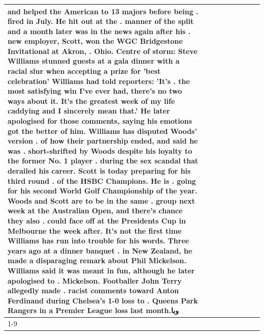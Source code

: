 \begin{table}[H]
\begin{tabular}{lllrlllll}
and helped the American to 13 majors before being . fired in July. He hit out at the . manner of the split and a month later was in the news again after his . new employer, Scott, won the WGC Bridgestone Invitational at Akron, . Ohio. Centre of storm: Steve Williams stunned guests at a gala dinner with a racial slur when accepting a prize for 'best celebration' Williams had told reporters: 'It's . the most satisfying win I've ever had, there's no two ways about it. It's the greatest week of my life caddying and I sincerely mean that.' He later apologised for those comments, saying his emotions got the better of him. Williams has disputed Woods' version . of how their partnership ended, and said he was . short-shrifted by Woods despite his loyalty to the former No. 1 player . during the sex scandal that derailed his career. Scott is today preparing for his third round . of the HSBC Champions. He is . going for his second World Golf Championship of the year. Woods and Scott are to be in the same . group next week at the Australian Open, and there's chance they also . could face off at the Presidents Cup in Melbourne the week after. It's not the first time Williams has run into trouble for his words. Three years ago at a dinner banquet . in New Zealand, he made a disparaging remark about Phil Mickelson. Williams said it was meant in fun, although he later apologised to . Mickelson. Footballer John Terry allegedly made . racist comments toward Anton Ferdinand during Chelsea's 1-0 loss to . Queens Park Rangers in a Premier League loss last month.وبا \\
\cline{1-9}

\end{tabular}
\end{table}
